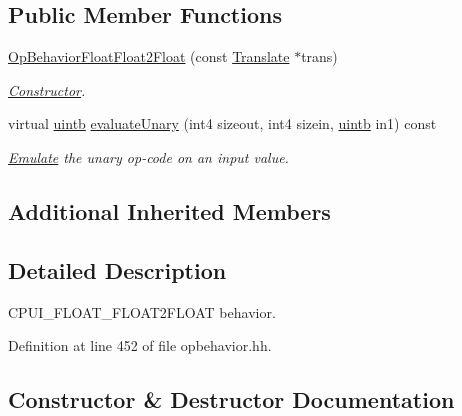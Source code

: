 \subsection*{Public Member Functions}
\begin{DoxyCompactItemize}
\item 
\mbox{\hyperlink{class_op_behavior_float_float2_float_a5a968dae646bdba565726751a0e31602}{Op\+Behavior\+Float\+Float2\+Float}} (const \mbox{\hyperlink{class_translate}{Translate}} $\ast$trans)
\begin{DoxyCompactList}\small\item\em \mbox{\hyperlink{class_constructor}{Constructor}}. \end{DoxyCompactList}\item 
virtual \mbox{\hyperlink{types_8h_a2db313c5d32a12b01d26ac9b3bca178f}{uintb}} \mbox{\hyperlink{class_op_behavior_float_float2_float_af536141f8e37c7800ce9f9ec9df51d20}{evaluate\+Unary}} (int4 sizeout, int4 sizein, \mbox{\hyperlink{types_8h_a2db313c5d32a12b01d26ac9b3bca178f}{uintb}} in1) const
\begin{DoxyCompactList}\small\item\em \mbox{\hyperlink{class_emulate}{Emulate}} the unary op-\/code on an input value. \end{DoxyCompactList}\end{DoxyCompactItemize}
\subsection*{Additional Inherited Members}


\subsection{Detailed Description}
C\+P\+U\+I\+\_\+\+F\+L\+O\+A\+T\+\_\+\+F\+L\+O\+A\+T2\+F\+L\+O\+AT behavior. 

Definition at line 452 of file opbehavior.\+hh.



\subsection{Constructor \& Destructor Documentation}
\mbox{\label{class_op_behavior_float_float2_float_a5a968dae646bdba565726751a0e31602}} 
